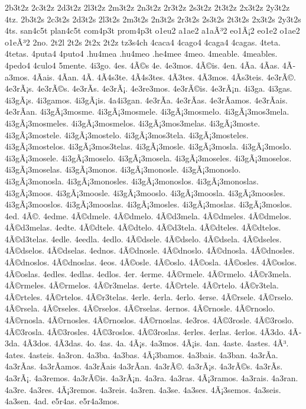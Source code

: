 {2b3t2z 2c3t2z 2d3t2z 2l3t2z 2m3t2z 2n3t2z 2r3t2z 2s3t2z 2t3t2z 2x3t2z 2y3t2z 4tz.
2b3t2s 2c3t2s 2d3t2s 2l3t2s 2m3t2s 2n3t2s 2r3t2s 2s3t2s 2t3t2s 2x3t2s 2y3t2s 4ts.
san4c5t
plan4c5t
com4p3t
prom4p3t
o1eu2
a1ae2
a1aÃ³2
eo1Ã¡2
eo1e2
o1ae2
o1eÃ³2
2no.
2t2l
2t2s
2t2x
2t2z
tz3s4ch
4caca4
4cago4
4caga4
4cagas.
4teta.
4tetas.
4puta4
4puto4
.hu4mea
.hu4meo
.he4mee
4meo.
4meable.
4meables.
4pedo4
4culo4
5mente.
4i3go.
4es.
4Ã©s
4e.
4e3mos.
4Ã©is.
4en.
4Ã­a.
4Ã­as.
4Ã­a3mos.
4Ã­ais.
4Ã­an.
4Ã­.
4Ã­4s3te.
4Ã­4s3tes.
4Ã­3tes.
4Ã­3mos.
4Ã­s3teis.
4e3rÃ©.
4e3rÃ¡s.
4e3rÃ©s.
4e3rÃ­s.
4e3rÃ¡.
4e3re3mos.
4e3rÃ©is.
4e3rÃ¡n.
4i3ga.
4i3gas.
4i3gÃ¡s.
4i3gamos.
4i3gÃ¡is.
4a4i3gan.
4e3rÃ­a.
4e3rÃ­as.
4e3rÃ­amos.
4e3rÃ­ais.
4e3rÃ­an.
4i3gÃ¡3mosme.
4i3gÃ¡3mosmele.
4i3gÃ¡3mosmelo.
4i3gÃ¡3mos3mela.
4i3gÃ¡3mosmeles.
4i3gÃ¡3mosmelos.
4i3gÃ¡3mos3melas.
4i3gÃ¡3moste.
4i3gÃ¡3mostele.
4i3gÃ¡3mostelo.
4i3gÃ¡3mos3tela.
4i3gÃ¡3mosteles.
4i3gÃ¡3mostelos.
4i3gÃ¡3mos3telas.
4i3gÃ¡3mosle.
4i3gÃ¡3mosla.
4i3gÃ¡3moslo.
4i3gÃ¡3mosele.
4i3gÃ¡3moselo.
4i3gÃ¡3mosela.
4i3gÃ¡3moseles.
4i3gÃ¡3moselos.
4i3gÃ¡3moselas.
4i3gÃ¡3monos.
4i3gÃ¡3monosle.
4i3gÃ¡3monoslo.
4i3gÃ¡3monosla.
4i3gÃ¡3monosles.
4i3gÃ¡3monoslos.
4i3gÃ¡3monoslas.
4i3gÃ¡3moos.
4i3gÃ¡3moosle.
4i3gÃ¡3mooslo.
4i3gÃ¡3moosla.
4i3gÃ¡3moosles.
4i3gÃ¡3mooslos.
4i3gÃ¡3mooslas.
4i3gÃ¡3mosles.
4i3gÃ¡3moslas.
4i3gÃ¡3moslos.
4ed.
4Ã©.
4edme.
4Ã©dmele.
4Ã©dmelo.
4Ã©d3mela.
4Ã©dmeles.
4Ã©dmelos.
4Ã©d3melas.
4edte.
4Ã©dtele.
4Ã©dtelo.
4Ã©d3tela.
4Ã©dteles.
4Ã©dtelos.
4Ã©d3telas.
4edle.
4eedla.
4edlo.
4Ã©dsele.
4Ã©dselo.
4Ã©dsela.
4Ã©dseles.
4Ã©dselos.
4Ã©dselas.
4ednos.
4Ã©dnosle.
4Ã©dnoslo.
4Ã©dnosla.
4Ã©dnosles.
4Ã©dnoslos.
4Ã©dnoslas.
4eos.
4Ã©osle.
4Ã©oslo.
4Ã©osla.
4Ã©osles.
4Ã©oslos.
4Ã©oslas.
4edles.
4edlas.
4edlos.
4er.
4erme.
4Ã©rmele.
4Ã©rmelo.
4Ã©r3mela.
4Ã©rmeles.
4Ã©rmelos.
4Ã©r3melas.
4erte.
4Ã©rtele.
4Ã©rtelo.
4Ã©r3tela.
4Ã©rteles.
4Ã©rtelos.
4Ã©r3telas.
4erle.
4erla.
4erlo.
4erse.
4Ã©rsele.
4Ã©rselo.
4Ã©rsela.
4Ã©rseles.
4Ã©rselos.
4Ã©rselas.
4ernos.
4Ã©rnosle.
4Ã©rnoslo.
4Ã©rnosla.
4Ã©rnosles.
4Ã©rnoslos.
4Ã©rnoslas.
4e3ros.
4Ã©3rosle.
4Ã©3roslo.
4Ã©3rosla.
4Ã©3rosles.
4Ã©3roslos.
4Ã©3roslas.
4erles.
4erlas.
4erlos.
4Ã­3do.
4Ã­3da.
4Ã­3dos.
4Ã­3das.
4o.
4as.
4a.
4Ã¡s.
4a3mos.
4Ã¡is.
4an.
4aste.
4astes.
4Ã³.
4ates.
4asteis.
4a3ron.
4a3ba.
4a3bas.
4Ã¡3bamos.
4a3bais.
4a3ban.
4a3rÃ­a.
4a3rÃ­as.
4a3rÃ­amos.
4a3rÃ­ais
4a3rÃ­an.
4a3rÃ©.
4a3rÃ¡s.
4a3rÃ©s.
4a3rÃ­s.
4a3rÃ¡.
4a3remos.
4a3rÃ©is.
4a3rÃ¡n.
4a3ra.
4a3ras.
4Ã¡3ramos.
4a3rais.
4a3ran.
4a3re.
4a3res.
4Ã¡3remos.
4a3reis.
4a3ren.
4a3se.
4a3ses.
4Ã¡3semos.
4a3seis.
4a3sen.
4ad.
e5r4as.
e5r4a3mos.
}
